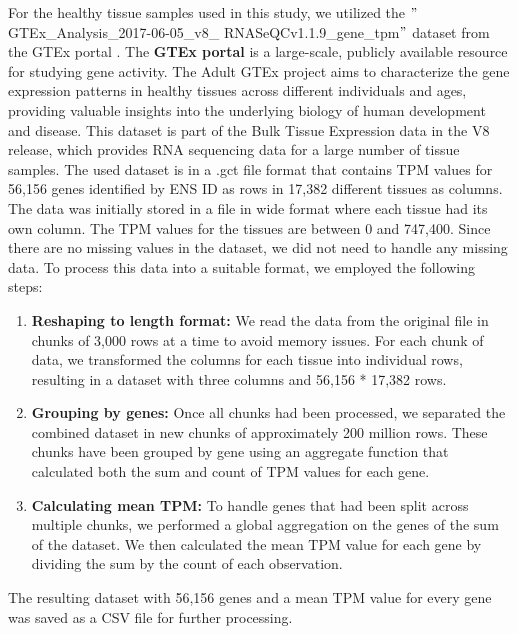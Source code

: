 For the healthy tissue samples used in this study,
we utilized the $"$GTEx\_Analysis\_2017-06-05\_v8\_\newline
RNASeQCv1.1.9\_gene\_tpm$"$ dataset from the GTEx portal \cite{gtex_download}.
The \textbf{GTEx portal} is a large-scale, publicly available resource for studying gene activity.
The Adult GTEx project aims to characterize the gene expression patterns in healthy tissues across different individuals and ages,
providing valuable insights into the underlying biology of human development and disease.
This dataset is part of the Bulk Tissue Expression data in the V8 release,
which provides RNA sequencing data for a large number of tissue samples.
The used dataset is in a .gct file format that contains TPM values for 56,156 genes identified by ENS ID as rows in 17,382 different tissues as columns.
The data was initially stored in a file in wide format where each tissue had its own column.
The TPM values for the tissues are between 0 and 747,400.
Since there are no missing values in the dataset, we did not need to handle any missing data.
To process this data into a suitable format, we employed the following steps:
\begin{enumerate}
    \item \textbf{Reshaping to length format:} We read the data from the original file in chunks of 3,000 rows at a time to avoid memory issues.
    For each chunk of data, we transformed the columns for each tissue into individual rows,
    resulting in a dataset with three columns and 56,156 * 17,382 rows.
    \item \textbf{Grouping by genes:} Once all chunks had been processed, we separated the combined dataset in new chunks of approximately 200 million rows.
    These chunks have been grouped by gene using an aggregate function that calculated both the sum and count of TPM values for each gene.
    \item \textbf{Calculating mean TPM:} To handle genes that had been split across multiple chunks,
    we performed a global aggregation on the genes of the sum of the dataset.
    We then calculated the mean TPM value for each gene by dividing the sum by the count of each observation.
\end{enumerate}
The resulting dataset with 56,156 genes and a mean TPM value for every gene was saved as a CSV file for further processing.\\


